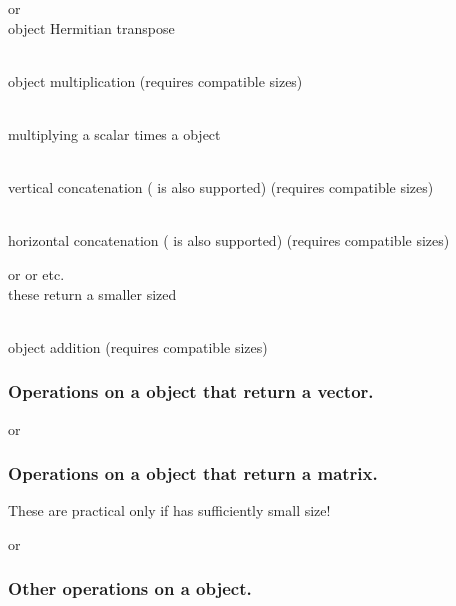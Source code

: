 \blist
\item
{} or 
\\
\fatrixx object Hermitian transpose
\item
{}
\\
\fatrixx object multiplication
(requires compatible sizes)
\item
{}
\\
multiplying a scalar times a \fatrixx object
\item
{}
\\
vertical concatenation ( is also supported)
(requires compatible sizes)
\item
{}
\\
horizontal concatenation ( is also supported) %
(requires compatible sizes)
\item
{} or  or  etc.
\\
these return a smaller sized \fatrixx
\item
{}
\\
\fatrixx object addition
(requires compatible sizes)
\elist


\subsubsection
{
Operations on a \fatrixx object
that return a vector.
}

\blist
\item
{} or 
\elist


\subsubsection
{
Operations on a \fatrixx object
that return a matrix.
}

These are practical only if  has sufficiently small size!

\blist
\item
{} or 
\item
{}
\item
{}
\elist


\subsubsection
{
Other operations on a \fatrixx object.
}

